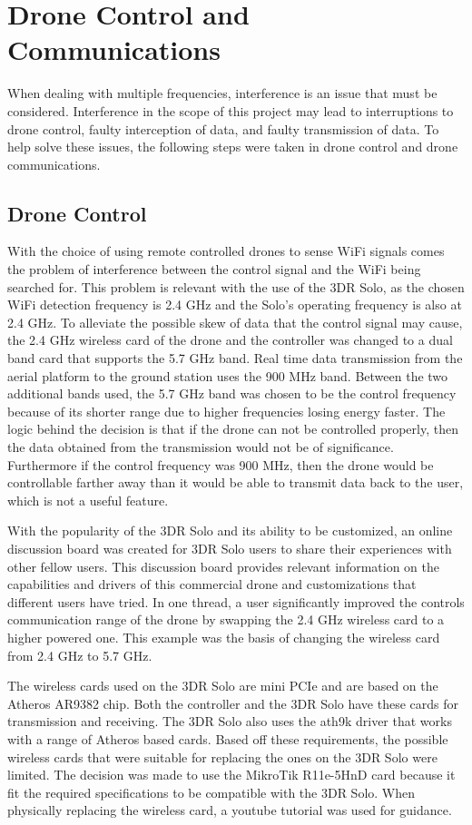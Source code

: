 \section{Drone Control and Communications}
When dealing with multiple frequencies, interference is an issue that must be considered. Interference in the scope of this project may lead to interruptions to drone control, faulty interception of data, and faulty transmission of data. To help solve these issues, the following steps were taken in drone control and drone communications.\par 

\subsection{Drone Control}
With the choice of using remote controlled drones to sense WiFi signals comes the problem of interference between the control signal and the WiFi being searched for. This problem is relevant with the use of the 3DR Solo, as the chosen WiFi detection frequency is 2.4 GHz and the Solo’s operating frequency is also at 2.4 GHz. To alleviate the possible skew of data that the control signal may cause, the 2.4 GHz wireless card of the drone and the controller was changed to a dual band card that supports the 5.7 GHz band. Real time data transmission from the aerial platform to the ground station uses the 900 MHz band. Between the two additional bands used, the 5.7 GHz band was chosen to be the control frequency because of its shorter range due to higher frequencies losing energy faster. The logic behind the decision is that if the drone can not be controlled properly, then the data obtained from the transmission would not be of significance. Furthermore if the control frequency was 900 MHz, then the drone would be controllable farther away than it would be able to transmit data back to the user, which is not a useful feature.\par 
With the popularity of the 3DR Solo and its ability to be customized, an online discussion board was created for 3DR Solo users to share their experiences with other fellow users. This discussion board provides relevant information on the capabilities and drivers of this commercial drone and customizations that different users have tried. In one thread, a user significantly improved the controls communication range of the drone by swapping the 2.4 GHz wireless card to a higher powered one. This example was the basis of changing the wireless card from 2.4 GHz to 5.7 GHz.\par 
The wireless cards used on the 3DR Solo are mini PCIe and are based on the Atheros AR9382 chip. Both the controller and the 3DR Solo have these cards for transmission and receiving. The 3DR Solo also uses the ath9k driver that works with a range of Atheros based cards. Based off these requirements, the possible wireless cards that were suitable for replacing the ones on the 3DR Solo were limited. The decision was made to use the MikroTik R11e-5HnD card because it fit the required specifications to be compatible with the 3DR Solo. When physically replacing the wireless card, a youtube tutorial was used for guidance. \par 

